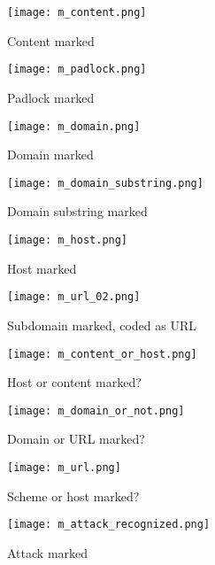 \begin{figure}
\centering
\texttt{[image: m\_content.png]}
\caption{Content marked}
\label{fig:content}
\end{figure}

\begin{figure}
\centering
\texttt{[image: m\_padlock.png]}
\caption{Padlock marked}
\label{fig:padlock}
\end{figure}

\begin{figure}
\centering
\texttt{[image: m\_domain.png]}
\caption{Domain marked}
\label{fig:m_domain}
\end{figure}


\begin{figure}
\centering
\texttt{[image: m\_domain\_substring.png]}
\caption{Domain substring marked}
\label{fig:m_domain_substring}
\end{figure}

\begin{figure}
\centering
\texttt{[image: m\_host.png]}
\caption{Host marked}
\label{fig:m_host}
\end{figure}

\begin{figure}
\centering
\texttt{[image: m\_url\_02.png]}
\caption{Subdomain marked, coded as URL}
\label{fig:m_url_02}
\end{figure}

\begin{figure}
\centering
\texttt{[image: m\_content\_or\_host.png]}
\caption{Host or content marked?}
\label{fig:m_content_or_host}
\end{figure}

\begin{figure}
\centering
\texttt{[image: m\_domain\_or\_not.png]}
\caption{Domain or URL marked?}
\label{fig:m_domain_or_not}
\end{figure}

\begin{figure}
\centering
\texttt{[image: m\_url.png]}
\caption{Scheme or host marked?}
\label{fig:m_url}
\end{figure}

\begin{figure}
\centering
\texttt{[image: m\_attack\_recognized.png]}
\caption{Attack marked}
\label{fig:m_attack_recognized}
\end{figure}



